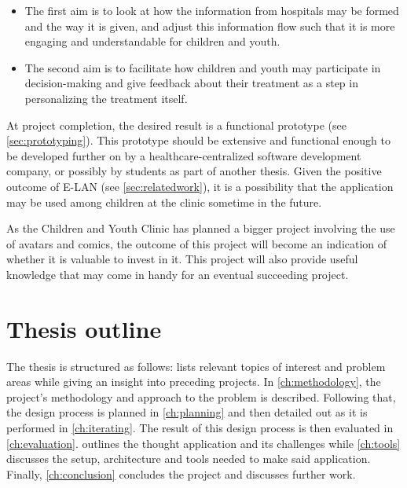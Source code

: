 \begin{itemize}
    \item The first aim is to look at how the information from hospitals may be formed and the way it is given, and adjust this information flow such that it is more engaging and understandable for children and youth.
    \item The second aim is to facilitate how children and youth may participate in decision-making and give feedback about their treatment as a step in personalizing the treatment itself.
\end{itemize}

At project completion, the desired result is a functional prototype (see \autoref{sec:prototyping}). This prototype should be extensive and functional enough to be developed further on by a healthcare-centralized software development company, or possibly by students as part of another thesis. Given the positive outcome of E-LAN (see \autoref{sec:relatedwork}), it is a possibility that the application may be used among children at the clinic sometime in the future.


As the Children and Youth Clinic has planned a bigger project involving the use of avatars and comics, the outcome of this project will become an indication of whether it is valuable to invest in it. This project will also provide useful knowledge that may come in handy for an eventual succeeding project.

\section{Thesis outline}
\label{sec:outline}

The thesis is structured as follows:  lists relevant topics of interest and problem areas while giving an insight into preceding projects. In \autoref{ch:methodology}, the project's methodology and approach to the problem is described. Following that, the design process is planned in \autoref{ch:planning} and then detailed out as it is performed in \autoref{ch:iterating}. The result of this design process is then evaluated in \autoref{ch:evaluation}.  outlines the thought application and its challenges while \autoref{ch:tools} discusses the setup, architecture and tools needed to make said application. Finally, \autoref{ch:conclusion} concludes the project and discusses further work.
